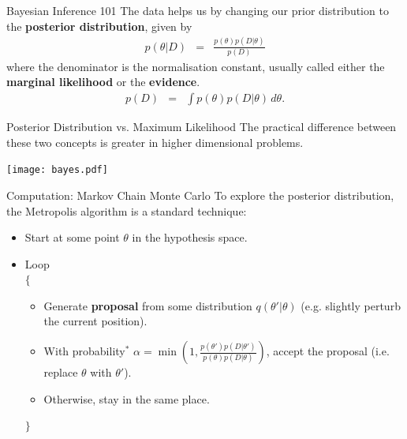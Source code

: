 \begin{frame}[t]{Bayesian Inference 101}
The data helps us by changing our prior distribution to the {\bf posterior
distribution}, given by
\begin{eqnarray}
p(\theta | D) &=& \frac{p(\theta) p(D|\theta)}{p(D)}
\end{eqnarray}
where the denominator is the normalisation constant, usually called either
the {\bf marginal likelihood} or the {\bf evidence}.
\begin{eqnarray}
p(D) &=& \int p(\theta)p(D|\theta) \, d\theta.
\end{eqnarray}

\end{frame}

\begin{frame}[t]{Posterior Distribution vs. Maximum Likelihood}
The practical difference between these two concepts is greater in higher
dimensional problems.
\begin{center}
\texttt{[image: bayes.pdf]}
\end{center}
\end{frame}



\begin{frame}[t]{Computation: Markov Chain Monte Carlo}
To explore the posterior distribution, the Metropolis algorithm is a standard
technique:

\begin{itemize}
\item Start at some point $\theta$ in the hypothesis space.
\item Loop\\
$\{$
  \begin{itemize}
  \item Generate {\bf proposal} from some distribution $q(\theta' | \theta)$
  (e.g. slightly perturb the current position).
  \item With probability$^*$ $\alpha = \min\left(1, \frac{p(\theta')p(D|\theta')}{p(\theta)p(D|\theta)}\right)$, accept the proposal (i.e. replace $\theta$ with $\theta'$).
  \item Otherwise, stay in the same place.
  \end{itemize}
$\}$
\end{itemize}
\end{frame}


